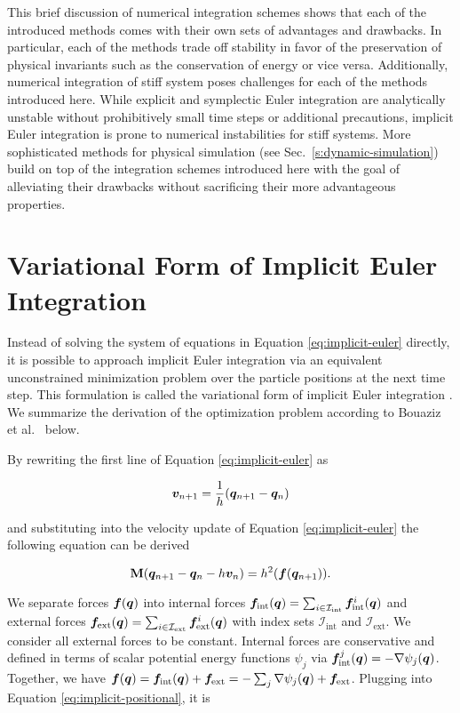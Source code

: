 This brief discussion of numerical integration schemes shows that each of the introduced methods comes with their own sets of advantages and
drawbacks. In particular, each of the methods trade off stability in favor of the preservation of physical invariants such as the conservation
of energy or vice versa. Additionally, numerical integration of stiff system poses challenges for each of the methods introduced here. While
explicit and symplectic Euler integration are analytically unstable without prohibitively small time steps or additional
precautions, implicit Euler integration is prone to numerical instabilities for stiff systems. More sophisticated methods for physical 
simulation (see Sec.\ \ref{s:dynamic-simulation}) build on top of the integration schemes introduced here with the goal of alleviating their 
drawbacks without sacrificing their more advantageous properties. 

\section{Variational Form of Implicit Euler Integration}\label{ss:variational-implicit-euler}

Instead of solving the system of equations in Equation \ref{eq:implicit-euler} directly, it is possible to approach implicit
Euler integration via an equivalent unconstrained minimization problem over the particle positions at the next time step. This formulation
is called the variational form of implicit Euler integration \cite{bouaziz2014}. We summarize the derivation of the optimization problem
according to Bouaziz et al.\ \cite{bouaziz2014} below.

By rewriting the first line of Equation \ref{eq:implicit-euler} as

\[
    \bm{v}_{n+1} = \frac{1}{h}(\bm{q}_{n+1} - \bm{q}_n)
\]

\noindent and substituting into the velocity update of Equation \ref{eq:implicit-euler} the following equation can be derived

\begin{equation}\label{eq:implicit-positional}
    \mathbf{M}(\bm{q}_{n+1} - \bm{q}_n - h\bm{v}_n) = h^2(\bm{f}(\bm{q}_{n+1})).
\end{equation}

\noindent We separate forces $\bm{f}(\bm{q})$ into internal forces $\bm{f}_{\text{int}}(\bm{q}) = \sum_{i \in \mathcal{I}_{\text{int}}} 
\bm{f}^i_{\text{int}}
(\bm{q})$ and external forces $\bm{f}_{\text{ext}}(\bm{q}) = \sum_{i \in \mathcal{I}_{\text{ext}}} \bm{f}^i_{\text{ext}}(\bm{q})$ 
with index sets $\mathcal{I}_{\text{int}}$ and $\mathcal{I}_{\text{ext}}$. We consider all external forces to be constant. Internal forces 
are conservative and defined in terms of scalar potential energy functions 
$\psi_j$ via $\bm{f}^j_{\text{int}}(\bm{q}) = -\nabla \psi_j(\bm{q})$. Together, we have $\bm{f} (\bm{q}) 
= \bm{f}_{\text{int}} (\bm{q}) + \bm{f}_{\text{ext}} = -\sum_j \nabla \psi_j(\bm{q}) + \bm{f}_{\text{ext}}$. Plugging into 
Equation \ref{eq:implicit-positional}, it is

